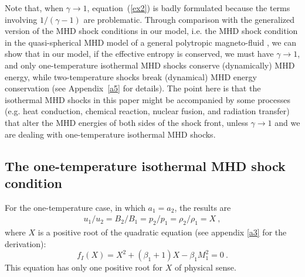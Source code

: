 \documentclass[fleqn,usenatbib]{mnras}
\begin{document}
Note that, when $\gamma\rightarrow 1$, equation~(\ref{ex2}) is badly formulated because the terms involving $1/(\gamma-1)$ are problematic. Through comparison with the generalized version of the MHD shock conditions in our model, i.e. the MHD shock condition in the quasi-spherical MHD model of a general polytropic magneto-fluid \citep{wang2008dynamic}, we can show that in our model, if the effective entropy is conserved, we must have $\gamma\rightarrow 1$, and only one-temperature isothermal MHD shocks conserve (dynamically) MHD energy, while two-temperature shocks break (dynamical) MHD energy conservation (see Appendix~\ref{a5} for details). The point here is that the isothermal MHD shocks in this paper might be accompanied by some processes (e.g. heat conduction, chemical reaction, nuclear fusion, and radiation transfer) that alter the MHD energies of both sides of the shock front, unless $\gamma\rightarrow 1$ and we are dealing with one-temperature isothermal MHD shocks.

\subsection{The one-temperature isothermal MHD shock condition}
\label{s3.1}
For the one-temperature case, in which $a_{1}=a_{2}$, the results are
\begin{gather}
u_{1}/u_{2}=B_{2}/B_{1}=p_{2}/p_{1}
 =\rho_{2}/\rho_{1}=X\ ,\label{e33}
\end{gather}
where $X$ is a positive root of the quadratic equation (see appendix \ref{a3} for the derivation):
\begin{equation}
f_{I}(X)=X^{2}+(\beta_{1}+1)X-\beta_{1}M_{1}^{2}=0\ .\label{e34}
\end{equation}
This equation has only one positive root for $X$ of physical sense. 
\end{document}

